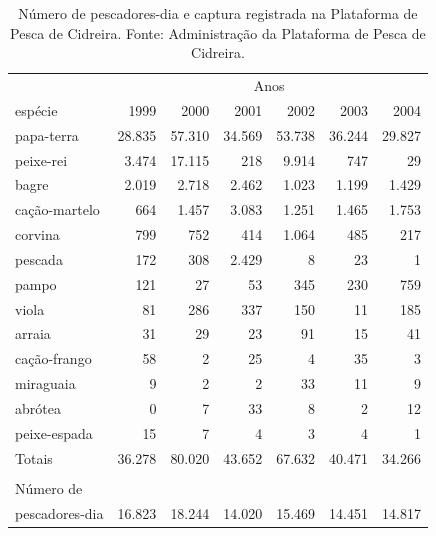 \documentclass[a4paper,11pt,twoside,showtrims,onecolumn,openright,final]{memoir}
\begin{document}
\begin{table}
\caption{Número de pescadores-dia e captura registrada na Plataforma de Pesca de Cidreira. 
         Fonte: Administração da Plataforma de Pesca de Cidreira.}
\label{tab:amador-npesca}	 
\begin{center}
\begin{tabular*}{\textwidth}{l@{\extracolsep{\fill}}rrrrrr}
\toprule
		& \multicolumn{6}{c}{Anos}       \\
\cmidrule(l){2-7}
espécie		& 1999		& 2000		& 2001		& 2002		& 2003		& 2004	\\
\midrule
papa-terra	& 28.835	& 57.310	& 34.569	& 53.738	& 36.244	& 29.827\\
peixe-rei	& 3.474		& 17.115	& 218		& 9.914		& 747		& 29	\\
bagre		& 2.019		& 2.718		& 2.462		& 1.023		& 1.199		& 1.429	\\
cação-martelo	& 664		& 1.457		& 3.083		& 1.251		& 1.465		& 1.753	\\
corvina		& 799		& 752		& 414		& 1.064		& 485		& 217	\\
pescada		& 172		& 308		& 2.429		& 8		& 23		& 1	\\
pampo		& 121		& 27		& 53		& 345		& 230		& 759	\\
viola		& 81		& 286		& 337		& 150		& 11		& 185	\\
arraia		& 31		& 29		& 23		& 91		& 15		& 41	\\
cação-frango	& 58		& 2		& 25		& 4		& 35		& 3	\\
miraguaia	& 9		& 2		& 2		& 33		& 11		& 9	\\
abrótea		& 0		& 7		& 33		& 8		& 2		& 12	\\
peixe-espada	& 15		& 7		& 4		& 3		& 4		& 1	\\
\midrule	
Totais		& 36.278	& 80.020	& 43.652	& 67.632	& 40.471	& 34.266\\
		&		&		&		&		&		&	\\
\midrule
Número de 	&		&		&		&		&		&	\\
pescadores-dia	& 16.823	& 18.244	& 14.020	& 15.469	& 14.451	& 14.817\\
\bottomrule
\end{tabular*}
\end{center}
\end{table}

\end{document}
